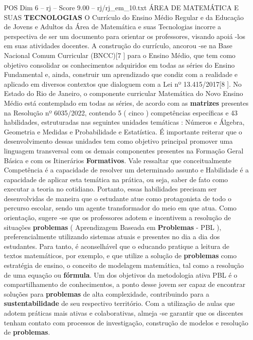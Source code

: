\begin{textsample}{POS Dim 6 – rj – Score 9.00 – rj/rj\_em\_10.txt}  \label{ex:f6_pos_271}
ÁREA DE MATEMÁTICA E SUAS \textbf{TECNOLOGIAS} O Currículo do Ensino Médio Regular e da Educação de Jovens e Adultos da Área de Matemática e suas Tecnologias incorre a perspectiva de ser um documento para orientar os professores, visando apoiá -los em suas atividades docentes.
A construção do currículo, ancorou -se na Base Nacional Comum Curricular (BNCC)[7 ] para o Ensino Médio, que tem como objetivo consolidar os conhecimentos adquiridos em todas as séries do Ensino Fundamental e, ainda, construir um aprendizado que condiz com a realidade e aplicado em diversos contextos que dialoguem com a Lei nº 13.415/2017[8 ].
No Estado do Rio de Janeiro, o componente curricular Matemática do Novo Ensino Médio está contemplado em todas as séries, de acordo com as \textbf{matrizes} presentes na Resolução nº 6035/2022, contendo 5 ( cinco ) competências específicas e 43 habilidades, estruturadas nas seguintes unidades temáticas : Números e Álgebra, Geometria e Medidas e Probabilidade e Estatística.
É importante reiterar que o desenvolvimento dessas unidades tem como objetivo principal promover uma linguagem transversal com os demais componentes presentes na Formação Geral Básica e com os Itinerários \textbf{Formativos}.
Vale ressaltar que conceitualmente Competência é a capacidade de resolver um determinado assunto e Habilidade é a capacidade de aplicar esta temática na prática, ou seja, saber de fato como executar a teoria no cotidiano.
Portanto, essas habilidades precisam ser desenvolvidas de maneira que o estudante atue como protagonista de todo o percurso escolar, sendo um agente transformador do meio em que atua.
Como orientação, sugere -se que os professores adotem e incentivem a resolução de situações \textbf{problemas} ( Aprendizagem Baseada em \textbf{Problemas} - PBL ), preferencialmente utilizando sistemas atuais e presentes no dia a dia dos estudantes.
Para tanto, é aconselhável que o educando pratique a leitura de textos matemáticos, por exemplo, e que utilize a solução de \textbf{problemas} como estratégia de ensino, o conceito de modelagem matemática, tal como a resolução de uma equação ou \textbf{fórmula}.
Um dos objetivos da metodologia ativa PBL é o compartilhamento de conhecimentos, a ponto desse jovem ser capaz de encontrar soluções para \textbf{problemas} de alta complexidade, contribuindo para a \textbf{sustentabilidade} de seu respectivo território.
Com a utilização de aulas que adotem práticas mais ativas e colaborativas, almeja -se garantir que os discentes tenham contato com processos de investigação, construção de modelos e resolução de \textbf{problemas}.

\end{textsample}
